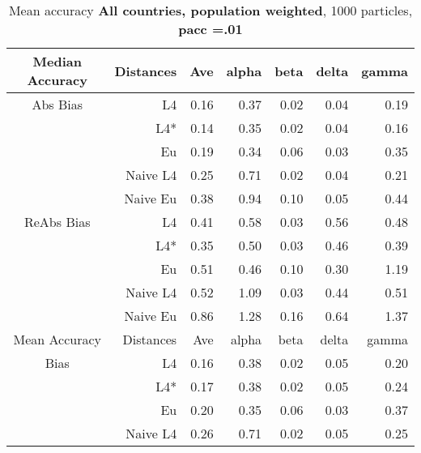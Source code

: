 \documentclass[a4paper,12pt,twoside]{book}
\begin{document}
\begin{table}[H]

\centering
\vfill
\vspace{2cm}
\caption{Mean  accuracy \textbf{All countries, population weighted}, 1000 particles, \textbf{pacc =.01}}


\begin{tabular}{crrrrrr}

  \hline
  
{\color{blue}Median Accuracy} & Distances & Ave & alpha & beta & delta & gamma \\ 
  \hline
{\color{blue}Abs Bias} & L4  &0.16 & 0.37 & 0.02 & 0.04 & 0.19 \\ 
   
&L4*  & 0.14 & 0.35 & 0.02 & 0.04 & 0.16 \\ 
  
&Eu &   0.19 & 0.34 & 0.06 & 0.03 & 0.35 \\ 
  
&Naive L4&      
 0.25 & 0.71 & 0.02 & 0.04 & 0.21 \\
&Naive Eu &  0.38 & 0.94 & 0.10 & 0.05 & 0.44 \\ 
  
   \hline
   
{\color{blue} ReAbs Bias } & L4  &0.41 & 0.58 & 0.03 & 0.56 & 0.48 \\ 
  
&L4*  &0.35 & 0.50 & 0.03 & 0.46 & 0.39 \\ 
  
&Eu &   
 0.51 & 0.46 & 0.10 & 0.30 & 1.19 \\ 
  
&Naive L4&  0.52 & 1.09 & 0.03 & 0.44 & 0.51 \\ 
&Naive Eu &   0.86 & 1.28 & 0.16 & 0.64 & 1.37 \\ 
  
   \hline
{\color{blue}Mean Accuracy} & Distances & Ave & alpha & beta & delta & gamma \\ 
  \hline
{\color{blue}Bias} & L4  &0.16 & 0.38 & 0.02 & 0.05 & 0.20 \\ 
  
&L4*  &0.17 & 0.38 & 0.02 & 0.05 & 0.24 \\ 
 
  
&Eu &    0.20 & 0.35 & 0.06 & 0.03 & 0.37 \\ 
  
&Naive L4&  
   
 0.26 & 0.71 & 0.02 & 0.05 & 0.25 \\ 
   

\end{tabular}
\end{table}
\end{document}
